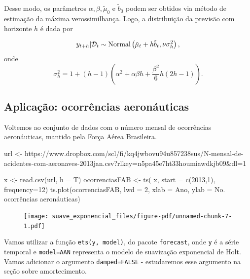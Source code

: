 \documentclass[
  letterpaper,
  DIV=11,
  numbers=noendperiod]{scrartcl}
\newenvironment{Shaded}{\begin{snugshade}}{\end{snugshade}}
\newcommand{\AttributeTok}[1]{\textcolor[rgb]{0.40,0.45,0.13}{#1}}
\newcommand{\DecValTok}[1]{\textcolor[rgb]{0.68,0.00,0.00}{#1}}
\newcommand{\FunctionTok}[1]{\textcolor[rgb]{0.28,0.35,0.67}{#1}}
\newcommand{\NormalTok}[1]{\textcolor[rgb]{0.00,0.23,0.31}{#1}}
\newcommand{\OtherTok}[1]{\textcolor[rgb]{0.00,0.23,0.31}{#1}}
\newcommand{\StringTok}[1]{\textcolor[rgb]{0.13,0.47,0.30}{#1}}
\theoremstyle{plain}
\theoremstyle{plain}
\theoremstyle{definition}
\theoremstyle{definition}
\theoremstyle{remark}
\begin{document}
Desse modo, os parâmetros \(\alpha,\beta,\tilde{\mu}_0\) e
\(\tilde{b}_0\) podem ser obtidos via método de estimação da máxima
verossimilhança. Logo, a distribuição da previsão com horizonte \(h\) é
dada por

\[y_{t+h}|\mathcal{D}_t\sim\hbox{Normal}\left(\tilde{\mu}_t+h\tilde{b}_t, \nu\sigma^2_h\right),\]
onde
\[\sigma^2_h = 1+(h-1)\left(\alpha^2 + \alpha\beta h + \frac{\beta^2}{6}h(2h-1)\right).\]

\hypertarget{aplicauxe7uxe3o-ocorruxeancias-aeronuxe1uticas}{%
\subsection{Aplicação: ocorrências
aeronáuticas}\label{aplicauxe7uxe3o-ocorruxeancias-aeronuxe1uticas}}

Voltemos ao conjunto de dados com o número mensal de ocorrências
aeronáuticas, mantido pela Força Aérea Brasileira.

\begin{Shaded}
\begin{Highlighting}[]
\NormalTok{url }\OtherTok{\textless{}{-}} \StringTok{\textquotesingle{}https://www.dropbox.com/scl/fi/kq4jwbovu94u857238sus/N{-}mensal{-}de{-}acidentes{-}com{-}aeronaves{-}2013jan.csv?rlkey=n5pa45e7ht33houmiawdkjb09\&dl=1\textquotesingle{}}


\NormalTok{x }\OtherTok{\textless{}{-}} \FunctionTok{read.csv}\NormalTok{(url, }\AttributeTok{h =}\NormalTok{ T)}
\NormalTok{ocorrenciasFAB }\OtherTok{\textless{}{-}} \FunctionTok{ts}\NormalTok{( x, }\AttributeTok{start =} \FunctionTok{c}\NormalTok{(}\DecValTok{2013}\NormalTok{,}\DecValTok{1}\NormalTok{), }\AttributeTok{frequency=}\DecValTok{12}\NormalTok{)}
\FunctionTok{ts.plot}\NormalTok{(ocorrenciasFAB, }\AttributeTok{lwd =} \DecValTok{2}\NormalTok{, }\AttributeTok{xlab =} \StringTok{\textquotesingle{}Ano\textquotesingle{}}\NormalTok{, }\AttributeTok{ylab =} \StringTok{\textquotesingle{}No. ocorrências aeronáuticas\textquotesingle{}}\NormalTok{)}
\end{Highlighting}
\end{Shaded}

\begin{figure}[H]

{\centering \texttt{[image: suave\_exponencial\_files/figure-pdf/unnamed-chunk-7-1.pdf]}

}

\end{figure}

Vamos utilizar a função \texttt{ets(y,\ model)}, do pacote
\texttt{forecast}, onde \texttt{y} é a série temporal e
\texttt{model=\textquotesingle{}AAN\textquotesingle{}} representa o
modelo de suavização exponencial de Holt. Vamos adicionar o argumento
\texttt{damped=FALSE} - estudaremos esse argumento na seção sobre
amortecimento.
\end{document}
